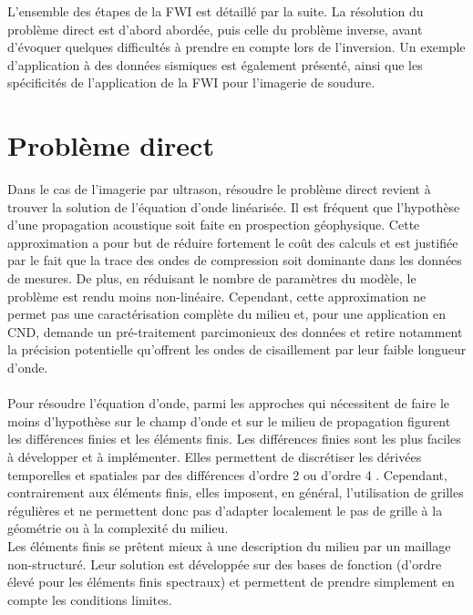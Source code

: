 L'ensemble des étapes de la FWI est détaillé par la suite. La résolution du problème direct est d'abord abordée, puis celle du problème inverse, avant d'évoquer quelques difficultés à prendre en compte lors de l'inversion. Un exemple d'application à des données sismiques est également présenté, ainsi que les spécificités de l'application de la FWI pour l'imagerie de soudure. \\



\section{Problème direct \label{pd_dir}}

Dans le cas de l'imagerie par ultrason, résoudre le problème direct revient à trouver la solution de l'équation d'onde linéarisée. Il est fréquent que l'hypothèse d'une propagation acoustique soit faite en prospection géophysique. Cette approximation a pour but de réduire fortement le coût des calculs et est justifiée par le fait que la trace des ondes de compression soit dominante dans les données de mesures. De plus, en réduisant le nombre de paramètres du modèle, le problème est rendu moins non-linéaire. Cependant, cette approximation ne permet pas une caractérisation complète du milieu et, pour une application en CND, demande un pré-traitement parcimonieux des données et retire notamment la précision potentielle qu'offrent les ondes de cisaillement par leur faible longueur d'onde.\\~\\




 Pour résoudre l'équation d'onde, parmi les approches qui nécessitent de faire le moins d'hypothèse sur le champ d'onde et sur le milieu de propagation figurent les différences finies et les éléments finis. Les différences finies sont les plus faciles à développer et à implémenter. Elles permettent de discrétiser les dérivées temporelles et spatiales par des différences d'ordre 2 \citep{virieux_86} ou d'ordre 4 \citep{levander}. Cependant, contrairement aux éléments finis, elles imposent, en général, l'utilisation de grilles régulières et ne permettent donc pas d'adapter localement le pas de grille à la géométrie ou à la complexité du milieu. \\ Les éléments finis se prêtent mieux à une description du milieu par un maillage non-structuré. Leur solution est développée sur des bases de fonction (d'ordre élevé pour les éléments finis spectraux) et permettent de prendre simplement en compte les conditions limites.\\
 
